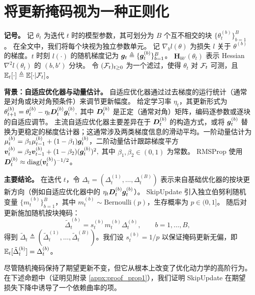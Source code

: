 \documentclass[11pt, a4paper, twocolumn, copyright, goog]{google}
\theoremstyle{plain}
\theoremstyle{definition}
\theoremstyle{remark}
\begin{document}
\section{将更新掩码视为一种正则化} \label{subsec:implicit_reg}

\textbf{记号。}
记 $\theta_t$ 为迭代 $t$ 时的模型参数，其可划分为 $B$ 个互不相交的块 $\{ \theta_t^{(b)} \}_{b=1}^B$。 
在全文中，我们将每个块视为独立参数单元。
记 $\nabla_b l(\theta)$ 为损失 $l$ 关于 $\theta^{(b)}$ 的梯度。$t$ 时刻 $l(\cdot)$ 的随机梯度记为 ${\bm{g}}_t \triangleq \{ {\bm{g}}_t^{(b)} \}_{b=1}^B$。
$\mathbf{H}_{bb'}(\theta_t)$ 表示 Hessian $\nabla^2 l(\theta_t)$ 的 $(b,b')$ 分块。 
令 $({\mathcal{F}}_t)_{t \geq 0}$ 为一个滤过，使得 $\theta_t$ 对 ${\mathcal{F}}_t$ 可测，且 $\mathbb{E}_t[\cdot] \triangleq \mathbb{E} [\cdot | {\mathcal{F}}_t]$。 

\textbf{背景：自适应优化器与动量估计。}
自适应优化器通过过去梯度的运行统计（通常是对角或块对角预条件）来调节更新幅度。 
给定学习率 $\eta_t$，其更新形式为 $\theta_{t+1}^{(b)} = \theta_t^{(b)} - \eta_t {\bm{D}}_t^{(b)} {\bm{g}}_t^{(b)},$
其中 ${\bm{D}}_t^{(b)}$ 是正定（通常对角）矩阵，编码逐参数或逐块的自适应调节。 
主流自适应优化器主要差异在于 ${\bm{D}}_t^{(b)}$ 的构造方式，或将 ${\bm{g}}_t^{(b)}$ 替换为更稳定的梯度估计器；这通常涉及两类梯度信息的滑动平均。一阶动量估计为 $\mu_{t}^{(b)} = \beta_1 \mu_{t-1}^{(b)} + (1 - \beta_1) {\bm{g}}_t^{(b)}$，二阶动量估计跟踪梯度平方 ${\bm{v}}_t^{(b)} = \beta_2 {\bm{v}}_{t-1}^{(b)} + (1 - \beta_2) ({\bm{g}}_t^{(b)})^2,$ 其中 $\beta_1, \beta_2 \in (0,1)$ 为常数。
RMSProp 使用 ${\bm{D}}_t^{(b)} \approx \text{diag} ({\bm{v}}_t^{(b)})^{-1/2}$。



\textbf{主要结论。}
在迭代 $t$，令 $\Delta_t = (\Delta_t^{(1)},\ldots,\Delta_t^{(B)})$ 表示来自基础优化器的按块更新方向（例如自适应优化器中的 $\eta_t {\bm{D}}_t^{(b)} {\bm{g}}_t^{(b)}$）。 
SkipUpdate 引入独立伯努利随机变量 $\{m_{t}^{(b)}\}_{b=1}^B$，其中 $m_{t}^{(b)} \sim \mathrm{Bernoulli}(p)$，生存概率为 $p \in (0,1]$。
随后对更新施加随机按块掩码： 
\begin{equation} \label{eq:rsu_def}
    \tilde{\Delta}_t^{(b)} =  s_t^{(b)} m_{t}^{(b)}\Delta_t^{(b)} , 
\qquad b = 1,\ldots,B,
\end{equation}
得到 $\tilde{\Delta}_t \triangleq (\tilde{\Delta}_t^{(1)},\ldots,\tilde{\Delta}_t^{(B)})$。我们设 $s_t^{(b)} = 1/ p$ 以保证掩码更新无偏，即 $\mathbb{E}_t [ \tilde{\Delta}_t^{(b)} ] = \Delta_t^{(b)}$。



尽管随机掩码保持了期望更新不变，但它从根本上改变了优化动力学的高阶行为。
在下述命题中（证明见附录 \ref{appx:proof_prop1}），我们证明 SkipUpdate 在期望损失下降中诱导了一个依赖曲率的项。
\end{document}

